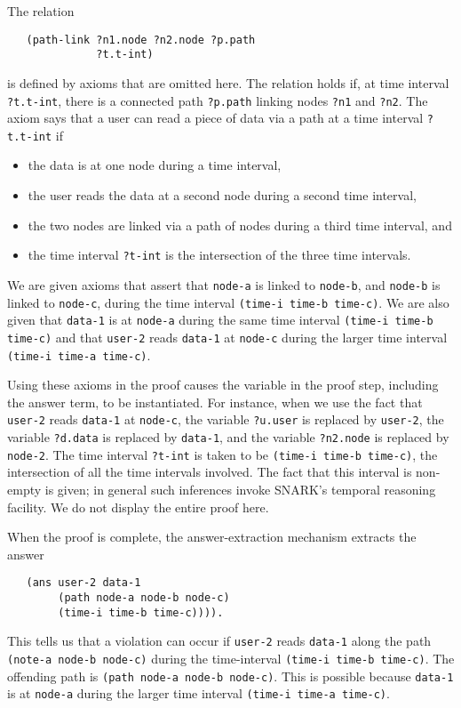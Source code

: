 The relation 
\begin{verbatim}
   (path-link ?n1.node ?n2.node ?p.path 
              ?t.t-int) 
\end{verbatim}
is defined by axioms that are omitted here. 
The relation holds if, at time interval \verb'?t.t-int', there is a connected path \verb'?p.path' linking nodes \verb'?n1' and \verb'?n2'. 
The axiom says that a user can read a piece of data via a path at a time interval \verb'?t.t-int' if
\begin{itemize}
\item the data is at one node during a time interval,
\item the user reads the data at a second node during a second time interval,
\item the two nodes are linked via a path of nodes during a third time interval, and
\item the time interval \verb'?t-int' is the intersection of the three time intervals.
\end{itemize}

We are given axioms that assert that \verb'node-a' is linked to \verb'node-b', and \verb'node-b' is linked to \verb'node-c', during the time interval \verb'(time-i time-b time-c)'. We are also given that \verb'data-1' is at \verb'node-a' during the same time interval 
\verb'(time-i time-b time-c)' and that \verb'user-2' reads \verb'data-1' at \verb'node-c' during the larger time interval \verb'(time-i time-a time-c)'.  

Using these axioms in the proof causes the variable in the proof step, including the answer term, to be instantiated.  
For instance, when we use the fact that \verb'user-2' reads \verb'data-1' at \verb'node-c', the variable \verb'?u.user' is replaced by \verb'user-2', the variable \verb'?d.data' is replaced by \verb'data-1', and the variable \verb'?n2.node' is replaced by \verb'node-2'.  
The time interval \verb'?t-int' is taken to be \verb'(time-i time-b time-c)', the intersection of all the time intervals involved. The fact that this interval is non-empty is given; in general such inferences invoke SNARK's temporal reasoning facility. We do not display the entire proof here. 

When the proof is complete, the answer-extraction mechanism extracts the answer
\begin{verbatim} 
   (ans user-2 data-1 
        (path node-a node-b node-c)
        (time-i time-b time-c)))).
\end{verbatim}
This tells us that a violation can occur if \verb'user-2' reads \verb'data-1' along the path \verb'(note-a node-b node-c)' during the time-interval \verb'(time-i time-b time-c)'. 
The offending path is \verb'(path node-a node-b node-c)'. 
This is possible because \verb'data-1' is at \verb'node-a' during the larger time interval 
\verb'(time-i time-a time-c)'.

